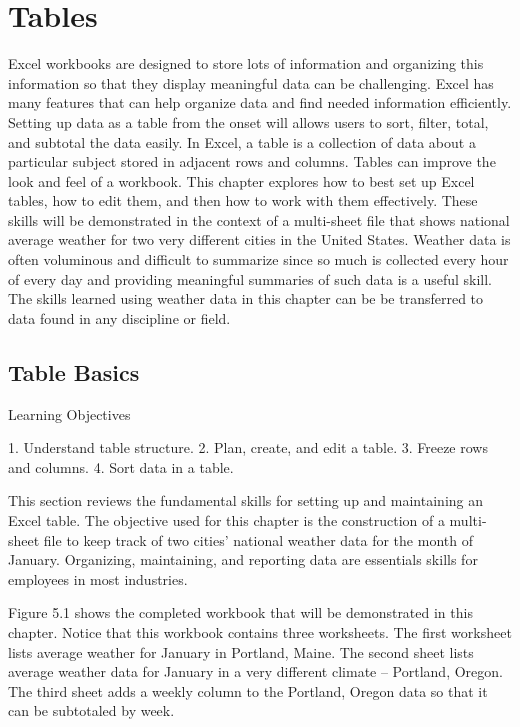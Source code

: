 \chapter{Tables}\label{ch05:tables}

Excel workbooks are designed to store lots of information and organizing this information so that they display meaningful data can be challenging. Excel has many features that can help organize data and find needed information efficiently. Setting up data as a table from the onset will allows users to sort, filter, total, and subtotal the data easily. In Excel, a table is a collection of data about a particular subject stored in adjacent rows and columns. Tables can improve the look and feel of a workbook. This chapter explores how to best set up Excel tables, how to edit them, and then how to work with them effectively. These skills will be demonstrated in the context of a multi-sheet file that shows national average weather for two very different cities in the United States. Weather data is often voluminous and difficult to summarize since so much is collected every hour of every day and providing meaningful summaries of such data is a useful skill. The skills learned using weather data in this chapter can be be transferred to data found in any discipline or field.


\section{Table Basics}


Learning Objectives


1. Understand table structure.
2. Plan, create, and edit a table.
3. Freeze rows and columns.
4. Sort data in a table.




This section reviews the fundamental skills for setting up and maintaining an Excel table. The
objective used for this chapter is the construction of a multi-sheet file to keep track of two cities’
national weather data for the month of January. Organizing, maintaining, and reporting data are
essentials skills for employees in most industries.

Figure 5.1 shows the completed workbook that will be demonstrated in this chapter. Notice that
this workbook contains three worksheets. The first worksheet lists average weather for January in
Portland, Maine. The second sheet lists average weather data for January in a very different climate –
Portland, Oregon. The third sheet adds a weekly column to the Portland, Oregon data so that it can
be subtotaled by week.


